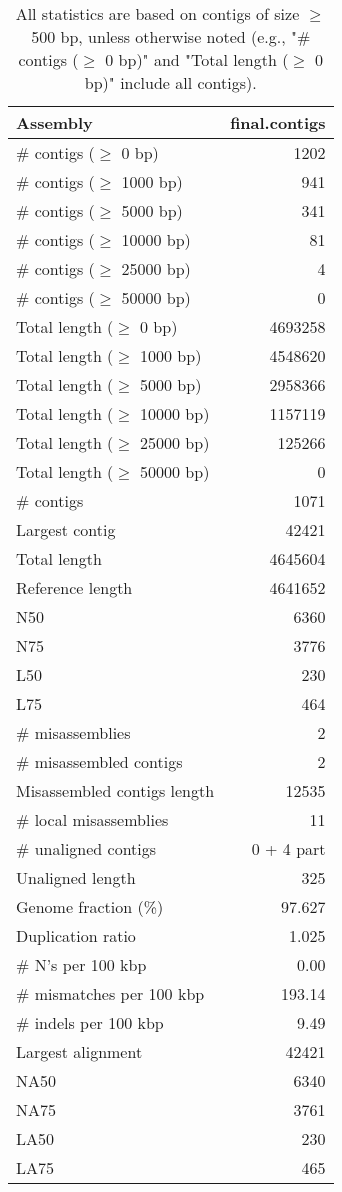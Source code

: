 \documentclass[12pt,a4paper]{article}
\begin{document}
\begin{table}[ht]
\begin{center}
\caption{All statistics are based on contigs of size $\geq$ 500 bp, unless otherwise noted (e.g., "\# contigs ($\geq$ 0 bp)" and "Total length ($\geq$ 0 bp)" include all contigs).}
\begin{tabular}{|l*{1}{|r}|}
\hline
Assembly & final.contigs \\ \hline
\# contigs ($\geq$ 0 bp) & 1202 \\ \hline
\# contigs ($\geq$ 1000 bp) & 941 \\ \hline
\# contigs ($\geq$ 5000 bp) & 341 \\ \hline
\# contigs ($\geq$ 10000 bp) & 81 \\ \hline
\# contigs ($\geq$ 25000 bp) & 4 \\ \hline
\# contigs ($\geq$ 50000 bp) & 0 \\ \hline
Total length ($\geq$ 0 bp) & 4693258 \\ \hline
Total length ($\geq$ 1000 bp) & 4548620 \\ \hline
Total length ($\geq$ 5000 bp) & 2958366 \\ \hline
Total length ($\geq$ 10000 bp) & 1157119 \\ \hline
Total length ($\geq$ 25000 bp) & 125266 \\ \hline
Total length ($\geq$ 50000 bp) & 0 \\ \hline
\# contigs & 1071 \\ \hline
Largest contig & 42421 \\ \hline
Total length & 4645604 \\ \hline
Reference length & 4641652 \\ \hline
N50 & 6360 \\ \hline
N75 & 3776 \\ \hline
L50 & 230 \\ \hline
L75 & 464 \\ \hline
\# misassemblies & 2 \\ \hline
\# misassembled contigs & 2 \\ \hline
Misassembled contigs length & 12535 \\ \hline
\# local misassemblies & 11 \\ \hline
\# unaligned contigs & 0 + 4 part \\ \hline
Unaligned length & 325 \\ \hline
Genome fraction (\%) & 97.627 \\ \hline
Duplication ratio & 1.025 \\ \hline
\# N's per 100 kbp & 0.00 \\ \hline
\# mismatches per 100 kbp & 193.14 \\ \hline
\# indels per 100 kbp & 9.49 \\ \hline
Largest alignment & 42421 \\ \hline
NA50 & 6340 \\ \hline
NA75 & 3761 \\ \hline
LA50 & 230 \\ \hline
LA75 & 465 \\ \hline
\end{tabular}
\end{center}
\end{table}
\end{document}
